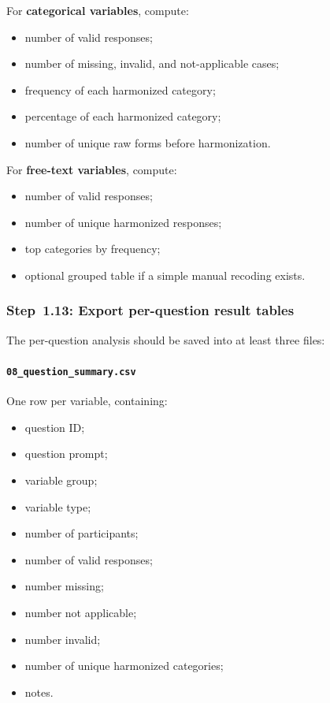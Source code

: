 \documentclass[11pt]{article}
\begin{document}
For \textbf{categorical variables}, compute:
\begin{itemize}
    \item number of valid responses;
    \item number of missing, invalid, and not-applicable cases;
    \item frequency of each harmonized category;
    \item percentage of each harmonized category;
    \item number of unique raw forms before harmonization.
\end{itemize}

For \textbf{free-text variables}, compute:
\begin{itemize}
    \item number of valid responses;
    \item number of unique harmonized responses;
    \item top categories by frequency;
    \item optional grouped table if a simple manual recoding exists.
\end{itemize}

\subsubsection{Step~1.13: Export per-question result tables}
The per-question analysis should be saved into at least three files:

\paragraph{\texttt{08\_question\_summary.csv}}
One row per variable, containing:
\begin{itemize}
    \item question ID;
    \item question prompt;
    \item variable group;
    \item variable type;
    \item number of participants;
    \item number of valid responses;
    \item number missing;
    \item number not applicable;
    \item number invalid;
    \item number of unique harmonized categories;
    \item notes.
\end{itemize}
\end{document}
